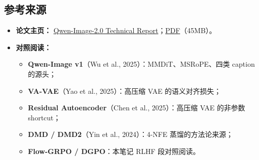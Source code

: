 \subsection{参考来源}

\begin{itemize}[leftmargin=1.5em]
  \item \textbf{论文主页：} \href{https://arxiv.org/abs/2605.10730}{Qwen-Image-2.0 Technical Report}；\href{https://arxiv.org/pdf/2605.10730}{PDF}（45MB）。
  \item \textbf{对照阅读：}
    \begin{itemize}[leftmargin=1.5em]
      \item \textbf{Qwen-Image v1}（Wu et al., 2025）：MMDiT、MSRoPE、四类 caption 的源头；
      \item \textbf{VA-VAE}（Yao et al., 2025）：高压缩 VAE 的语义对齐损失；
      \item \textbf{Residual Autoencoder}（Chen et al., 2025）：高压缩 VAE 的非参数 shortcut；
      \item \textbf{DMD / DMD2}（Yin et al., 2024）：4-NFE 蒸馏的方法论来源；
      \item \textbf{Flow-GRPO / DGPO}：本笔记 RLHF 段对照阅读。
    \end{itemize}
\end{itemize}
